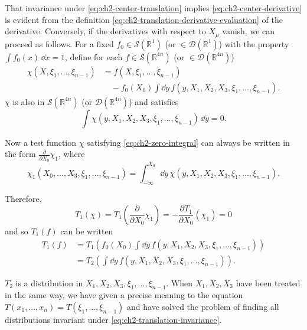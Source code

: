 That invariance under \eqref{eq:ch2-center-translation} implies \eqref{eq:ch2-center-derivative} is evident from the definition
\eqref{eq:ch2-translation-derivative-evaluation} of the derivative. Conversely, if the derivatives with respect to
$X_\mu$ vanish, we can proceed as follows. For a fixed
$f_0\in\mathcal{S}(\mathbb{R}^1)$ (or $\in\mathcal{D}(\mathbb{R}^1)$) with the
property $\int f_0(x)\,\dd x=1$, define for each
$f\in\mathcal{S}(\mathbb{R}^{4n})$ (or $\in\mathcal{D}(\mathbb{R}^{4n})$)
\begin{equation}
\begin{aligned}
  \chi(X,\xi_1,\ldots,\xi_{n-1})
    & =f(X,\xi_1,\ldots,\xi_{n-1})\\
    &\quad-f_0(X_0)\int \dd y\,f(y,X_1,X_2,X_3,
      \xi_1,\ldots,\xi_{n-1}).
\end{aligned}
\tag{2-22}\label{eq:ch2-zero-integral-test-function}
\end{equation}
$\chi$ is also in $\mathcal{S}(\mathbb{R}^{4n})$ (or
$\mathcal{D}(\mathbb{R}^{4n})$) and satisfies
\begin{equation}
  \int\chi(y,X_1,X_2,X_3,\xi_1,\ldots,\xi_{n-1})\,\dd y=0.
\tag{2-23}\label{eq:ch2-zero-integral}
\end{equation}

Now a test function $\chi$ satisfying \eqref{eq:ch2-zero-integral} can always be written in the
form $\frac{\partial}{\partial X_0}\chi_1$, where
\begin{equation*}
  \chi_1(X_0,\ldots,X_3,\xi_1,\ldots,\xi_{n-1})
  =\int_{-\infty}^{X_0}\dd y\,
    \chi(y,X_1,X_2,X_3,\xi_1,\ldots,\xi_{n-1}).
\end{equation*}

Therefore,
\begin{equation}
  T_1(\chi)=T_1\left(\frac{\partial}{\partial X_0}\chi_1\right)
  =-\frac{\partial T_1}{\partial X_0}(\chi_1)=0
\tag{2-24}\label{eq:ch2-center-derivative-vanishes}
\end{equation}
and so $T_1(f)$ can be written
\begin{equation}
\begin{aligned}
  T_1(f)&=T_1\left(f_0(X_0)\int \dd y\,f(y,X_1,X_2,X_3,
    \xi_1,\ldots,\xi_{n-1})\right)\\
  &=T_2\left(\int \dd y\,f(y,X_1,X_2,X_3,
    \xi_1,\ldots,\xi_{n-1})\right).
\end{aligned}
\tag{2-25}\label{eq:ch2-reduced-distribution}
\end{equation}

\begin{sloppypar}
$T_2$ is a distribution in $X_1,X_2,X_3,\xi_1,\ldots,\xi_{n-1}$. When
$X_1,X_2,X_3$ have been treated in the same way, we have given a precise
meaning to the equation $T(x_1,\ldots,x_n)=T(\xi_1,\ldots,\xi_{n-1})$ and
have solved the problem of finding all distributions invariant under \eqref{eq:ch2-translation-invariance}.
\end{sloppypar}

